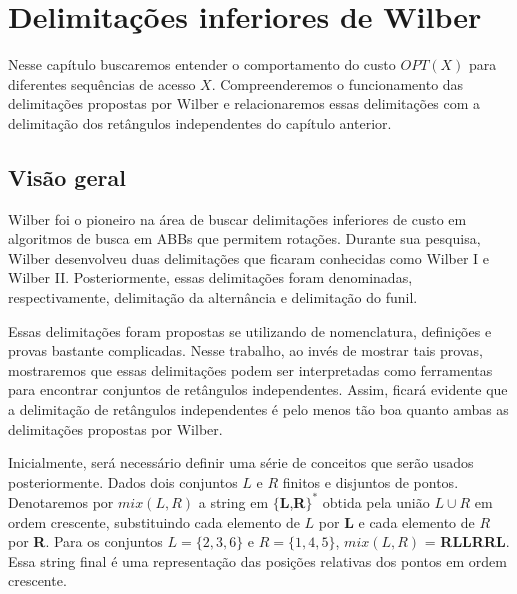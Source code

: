 
\chapter{Delimitações inferiores de Wilber}
\label{cap:wilber}

\newcommand{\cT}{\mathcal{T}}

Nesse capítulo buscaremos entender o comportamento do custo $OPT(X)$ para diferentes sequências de acesso $X$. Compreenderemos o funcionamento das delimitações propostas por Wilber \cite{lowerbound_wilber} e relacionaremos essas delimitações com a delimitação dos retângulos independentes do capítulo anterior.

\section{Visão geral}

Wilber foi o pioneiro na área de buscar delimitações inferiores de custo em algoritmos de busca em ABBs que permitem rotações. Durante sua pesquisa, Wilber desenvolveu duas delimitações que ficaram conhecidas como Wilber I e Wilber II. Posteriormente, essas delimitações foram denominadas, respectivamente, delimitação da alternância e delimitação do funil. 

Essas delimitações foram propostas se utilizando de nomenclatura, definições e provas bastante complicadas. Nesse trabalho, ao invés de mostrar tais provas, mostraremos que essas delimitações podem ser interpretadas como ferramentas para encontrar conjuntos de retângulos independentes. Assim, ficará evidente que a delimitação de retângulos independentes é pelo menos tão boa quanto ambas as delimitações propostas por Wilber.

Inicialmente, será necessário definir uma série de conceitos que serão usados posteriormente.
Dados dois conjuntos $L$ e $R$ finitos e disjuntos de pontos. Denotaremos por $mix(L,R)$ a string em $\{$\textbf{L},\textbf{R}$\}^{*}$ obtida pela união $L \cup R$ em ordem crescente, substituindo cada elemento de $L$ por \textbf{L} e cada elemento de $R$ por \textbf{R}. Para os conjuntos $L = \{2,3,6\}$ e $R = \{1,4,5\}$, $mix(L,R)$ = \textbf{RLLRRL}. Essa string final é uma representação das posições relativas dos pontos em ordem crescente.

